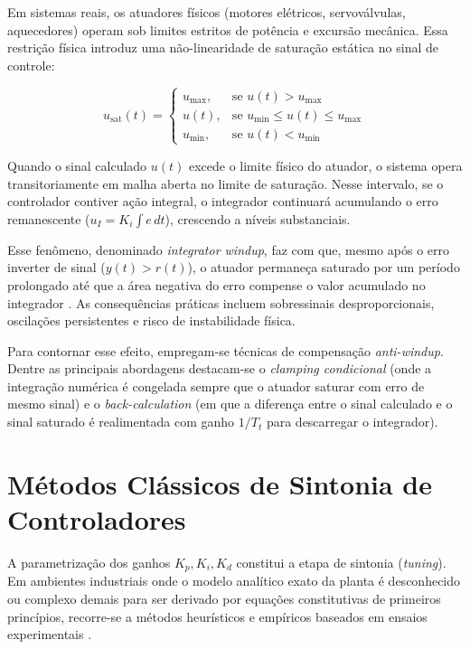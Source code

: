 Em sistemas reais, os atuadores físicos (motores elétricos, servoválvulas, aquecedores) operam sob limites estritos de potência e excursão mecânica. Essa restrição física introduz uma não-linearidade de saturação estática no sinal de controle:

\begin{equation}
    u_{\text{sat}}(t) = 
    \begin{cases}
        u_{\max}, & \text{se } u(t) > u_{\max} \\
        u(t), & \text{se } u_{\min} \le u(t) \le u_{\max} \\
        u_{\min}, & \text{se } u(t) < u_{\min}
    \end{cases}
    \label{eq:saturacao}
\end{equation}

Quando o sinal calculado $u(t)$ excede o limite físico do atuador, o sistema opera transitoriamente em malha aberta no limite de saturação. Nesse intervalo, se o controlador contiver ação integral, o integrador continuará acumulando o erro remanescente ($u_I = K_i \int e \, dt$), crescendo a níveis substanciais. 

Esse fenômeno, denominado \textit{integrator windup}, faz com que, mesmo após o erro inverter de sinal ($y(t) > r(t)$), o atuador permaneça saturado por um período prolongado até que a área negativa do erro compense o valor acumulado no integrador \cite{astrom2006, franklin2015}. As consequências práticas incluem sobressinais desproporcionais, oscilações persistentes e risco de instabilidade física.

Para contornar esse efeito, empregam-se técnicas de compensação \textit{anti-windup}. Dentre as principais abordagens destacam-se o \textit{clamping condicional} (onde a integração numérica é congelada sempre que o atuador saturar com erro de mesmo sinal) e o \textit{back-calculation} (em que a diferença entre o sinal calculado e o sinal saturado é realimentada com ganho $1/T_t$ para descarregar o integrador).

\section{Métodos Clássicos de Sintonia de Controladores}
\label{sec:metodos_sintonia}

A parametrização dos ganhos $K_p, K_i, K_d$ constitui a etapa de sintonia (\textit{tuning}). Em ambientes industriais onde o modelo analítico exato da planta é desconhecido ou complexo demais para ser derivado por equações constitutivas de primeiros princípios, recorre-se a métodos heurísticos e empíricos baseados em ensaios experimentais \cite{cohen1953}.

